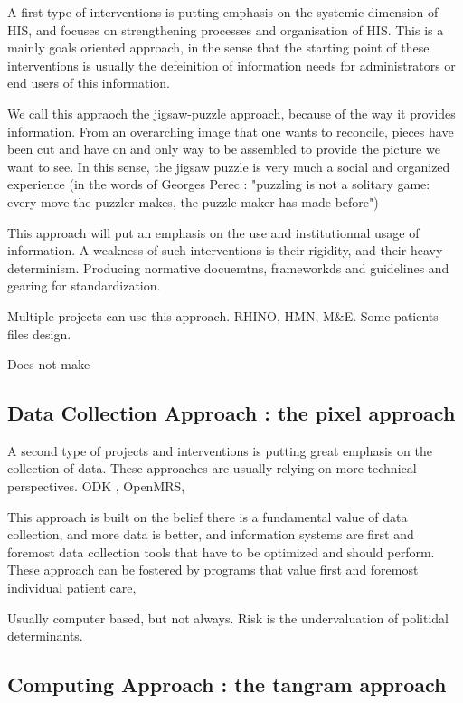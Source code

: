 \documentclass[letterpaper, 10 pt, conference]{ieeeconf}  %
\begin{document}
A first type of interventions is putting emphasis on the systemic dimension of HIS, and focuses on strengthening processes and organisation of HIS. This is a mainly goals oriented approach, in the sense that the starting point of these interventions is usually the defeinition of information needs for administrators or end users of this information.

We call this appraoch the jigsaw-puzzle approach, because of the way it provides information. From an overarching image that one wants to reconcile, pieces have been cut and have on and only way to be assembled to provide the picture we want to see. In this sense, the jigsaw puzzle is very much a social and organized experience (in the words of Georges Perec : "puzzling is not a solitary game: every move the puzzler makes, the puzzle-maker has made before")

This approach will put an emphasis on the use and institutionnal usage of information. A weakness of such interventions is their rigidity, and their heavy determinism. Producing normative docuemtns, frameworkds and guidelines and gearing for standardization.

Multiple projects can use this approach. RHINO, HMN, M\&E. Some patients files design.

Does not make

\cite{rhino_introducing_2003}

\subsection{Data Collection Approach : the pixel approach}

A second type of projects and interventions is putting great emphasis on the collection of data. These approaches are usually relying on more technical perspectives. ODK , OpenMRS,

This approach is built on the belief there is a fundamental value of data collection, and more data is better, and information systems are first and foremost data collection tools that have to be optimized and should perform. These approach can be fostered by programs that value first and foremost individual patient care,

Usually computer based, but not always. Risk is the undervaluation of politidal determinants.

\subsection{Computing Approach : the tangram approach}
\end{document}
